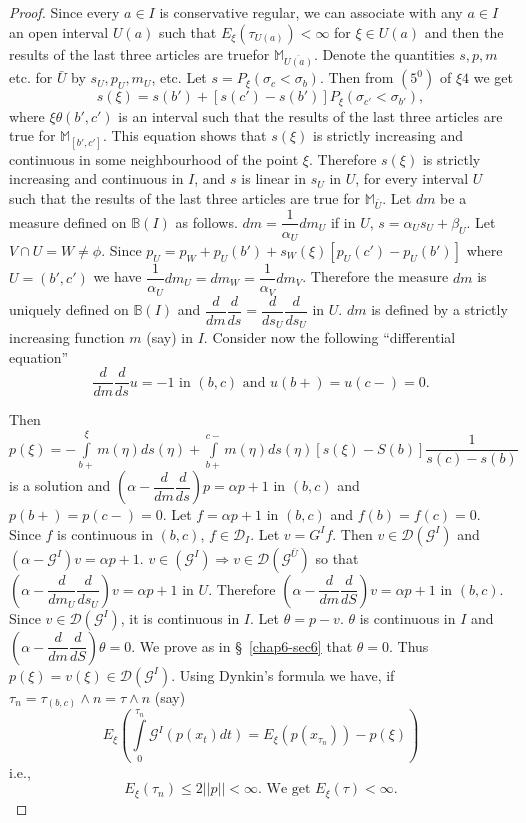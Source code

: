 \begin{proof}
Since every $a \in I$ is conservative regular, we can associate with
  any $a \in I$ an open interval $U(a)$ such that $E_\xi (\tau_{U(a)})
  < \infty$ for $\xi \in U(a)$ and then the results of the last three
  articles are true\pageoriginale for $\mathbb{M}_{\overline{U(a)}}$. Denote the
  quantities $s, p, m$ etc. for $\bar{U}$ by $s_U, p_U, m_U$, etc. Let
  $s = P_\xi (\sigma_c < \sigma_b)$. Then from $(5^0)$ of $\xi 4$ we
  get  
  $$
  s (\xi ) = s(b') + [s(c') - s(b')] P_\xi (\sigma_{c'} < \sigma_{b'}),
  $$
  where $\xi \theta(b', c')$ is an interval such that the results of
  the last three articles are true for $\mathbb{M}_{[b', c']}$. This
  equation shows that $s(\xi)$ is strictly increasing and continuous in
  some neighbourhood of the point $\xi$. Therefore $s(\xi)$ is
  strictly increasing and continuous in $I$, and $s$ is linear in
  $s_U$ in $U$, for every interval $U$ such that the results of the last
  three articles are true for $\mathbb{M}_{\bar{U}}$. Let $dm$ be a
  measure defined on $\mathbb{B}(I)$ as follows. $dm =
  \dfrac{1}{\alpha_U} dm_U$ if in $U$, $s=\alpha_U s_U + \beta_U$. Let
  $V\cap U =W \neq \phi$. Since $p_U = p_W + p_U (b') + s_W (\xi)
        [p_U (c') - p_U (b')]$ where $U= (b', c')$ we have
        $\dfrac{1}{\alpha_U} dm_U = dm_W = \dfrac{1}{\alpha_V}
        dm_V$. Therefore the measure $dm$ is uniquely defined on
        $\mathbb{B}(I)$ and $\dfrac{d}{dm}\dfrac{d}{ds} =
        \dfrac{d}{ds_U} \dfrac{d}{ds_U}$ in $U$. $dm$ is defined by a
        strictly increasing function $m$ (say) in $I$. Consider now
        the following ``differential equation'' 
  $$
  \frac{d}{dm}\frac{d}{ds} u=- 1 \text{ \ in \ } (b, c) \text{ \ and
    \ } u(b+) = u(c-) = 0. 
  $$

Then $p(\xi) = - \int\limits^{\xi}_{b+} m (\eta) ds (\eta) +
\int\limits^{c-}_{b+} m(\eta) ds (\eta) [s (\xi) - S (b)]
\dfrac{1}{s (c)- s (b)}$ is a solution and $(\alpha - \dfrac{d}{dm}
\dfrac{d}{ds}) p = \alpha p+1$ in $(b, c)$ and $p(b+) = p(c-) =
0$. Let $f = \alpha p+1$ in $(b, c)$ and $f(b) = f(c) = 0$. Since
$f$ is continuous in $(b, c)$, $f \in \mathscr{D}_I$. Let $v = G^I
f$. Then $v \in \mathscr{D} (\mathscr{G}^I)$ and\pageoriginale 
$(\alpha - \mathscr{G}^I)v = \alpha  p + 1$. $v \in (\mathscr {G}^I)
\Rightarrow v \in \mathscr{D} (\mathscr{G}^{\bar{U}})$ so that
$(\alpha - \dfrac{d}{dm_U} \dfrac{d}{ds_U}) v = \alpha p+1$ in
$U$. Therefore $(\alpha - \dfrac{d}{dm}\dfrac{d}{dS}) v = \alpha p+1$ 
in $(b, c)$. Since $v \in \mathscr{D}(\mathscr{G}^I)$, it is
continuous in $I$. Let $\theta = p - v$. $\theta$ is continuous in $I$
and $(\alpha - \dfrac{d}{dm} \dfrac{d}{dS})\theta =0$. We prove as
in \S\ \ref{chap6-sec6} that $\theta = 0$. Thus $p(\xi) = v (\xi) \in \mathscr{D}
(\mathscr{G}^I)$. Using Dynkin's formula we have, if $\tau_n =
\tau_{(b, c)} \wedge n = \tau \wedge n$ (say)  
$$
E_\xi \left(\int\limits^{\tau_n}_{0} \mathscr{G}^I (p (x_t) dt) = E_\xi (p
  (x_{\tau_n})) - p(\xi)\right)
$$
i.e.,
$$ 
E_\xi (\tau_n) \leq 2 || p || < \infty. \text{ \ We get \ } E_\xi (\tau)
  < \infty.
$$
 

\end{proof}
